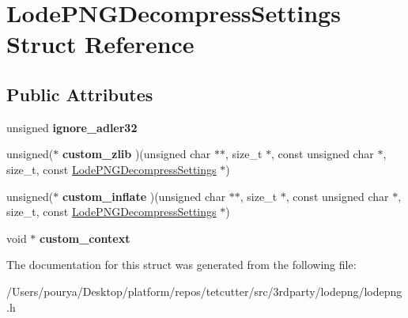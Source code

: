 \hypertarget{structLodePNGDecompressSettings}{}\section{Lode\+P\+N\+G\+Decompress\+Settings Struct Reference}
\label{structLodePNGDecompressSettings}
\subsection*{Public Attributes}
\begin{DoxyCompactItemize}
\item 
\hypertarget{structLodePNGDecompressSettings_afab4b919650b51b4d2f175a60ed6c580}{}unsigned {\bfseries ignore\+\_\+adler32}\label{structLodePNGDecompressSettings_afab4b919650b51b4d2f175a60ed6c580}

\item 
\hypertarget{structLodePNGDecompressSettings_a9dd432e46330dbd2ce3ef1929c64337d}{}unsigned($\ast$ {\bfseries custom\+\_\+zlib} )(unsigned char $\ast$$\ast$, size\+\_\+t $\ast$, const unsigned char $\ast$, size\+\_\+t, const \hyperlink{structLodePNGDecompressSettings}{Lode\+P\+N\+G\+Decompress\+Settings} $\ast$)\label{structLodePNGDecompressSettings_a9dd432e46330dbd2ce3ef1929c64337d}

\item 
\hypertarget{structLodePNGDecompressSettings_a023aa5946c99934d40280850a4d8b204}{}unsigned($\ast$ {\bfseries custom\+\_\+inflate} )(unsigned char $\ast$$\ast$, size\+\_\+t $\ast$, const unsigned char $\ast$, size\+\_\+t, const \hyperlink{structLodePNGDecompressSettings}{Lode\+P\+N\+G\+Decompress\+Settings} $\ast$)\label{structLodePNGDecompressSettings_a023aa5946c99934d40280850a4d8b204}

\item 
\hypertarget{structLodePNGDecompressSettings_aa8d507077609be70ab1f260f04167d91}{}void $\ast$ {\bfseries custom\+\_\+context}\label{structLodePNGDecompressSettings_aa8d507077609be70ab1f260f04167d91}

\end{DoxyCompactItemize}


The documentation for this struct was generated from the following file\+:\begin{DoxyCompactItemize}
\item 
/\+Users/pourya/\+Desktop/platform/repos/tetcutter/src/3rdparty/lodepng/lodepng.\+h\end{DoxyCompactItemize}

